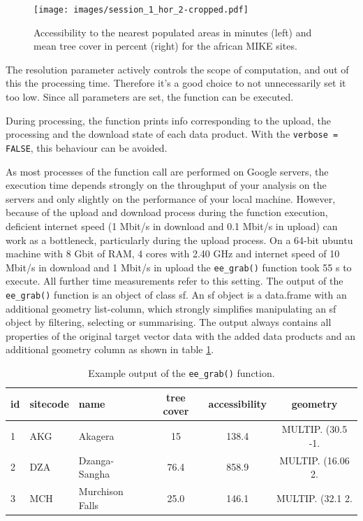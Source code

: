 \begin{center}
	\begin{figure}
		\begin{center}
			\texttt{[image: images/session\_1\_hor\_2-cropped.pdf]}
			\caption{Accessibility to the nearest populated areas in minutes (left) and mean tree cover in percent (right) for the african MIKE sites.}
			\label{sample_session_1}
		\end{center}
	\end{figure}
\end{center}

The resolution parameter actively controls the scope of computation, and out of this the processing time. Therefore it's a good choice to not unnecessarily set it too low. 
Since all parameters are set, the function can be executed. 



During processing, the function prints info corresponding to the upload, the processing and the download state of each data product. With the \texttt{verbose = FALSE}, this behaviour can be avoided. 





As most processes of the function call are performed on Google servers, the execution time depends strongly on the throughput of your analysis on the servers and only slightly on the performance of your local machine. However, because of the upload and download process during the function execution, deficient internet speed (1 Mbit/s in download and 0.1 Mbit/s in upload) can work as a bottleneck, particularly during the upload process. 
On a 64-bit ubuntu machine with 8 Gbit of RAM, 4 cores with 2.40 GHz and internet speed of 10 Mbit/s in download and 1 Mbit/s in upload the \texttt{ee\_grab()} function took 55 s to execute. All further time measurements refer to this setting.
The output of the \texttt{ee\_grab()} function is an object of class sf. An sf object is a data.frame with an additional geometry list-column, which strongly simplifies manipulating an sf object by filtering, selecting or summarising. The output always contains all properties of the original target vector data with the added data products and an additional geometry column as shown in table \ref{output}.

\begin{table}[h]
	\captionsetup{justification=raggedright,
		singlelinecheck=false
	}
	\caption{Example output of the \texttt{ee\_grab()} function.}
	\begin{tabularx}{\textwidth}{lllccc}
		\toprule
		id & sitecode & name & tree cover & accessibility & geometry \\
		\midrule
		1  & AKG  & Akagera & 15 & 138.4 & MULTIP. (30.5 -1.\\
		2 & DZA  & Dzanga-Sangha & 76.4 & 858.9 & MULTIP. (16.06 2.\\
		3 & MCH  & Murchison Falls & 25.0 & 146.1 & MULTIP. (32.1 2.\\
		\bottomrule
	\end{tabularx}

	\label{output}
\end{table}



